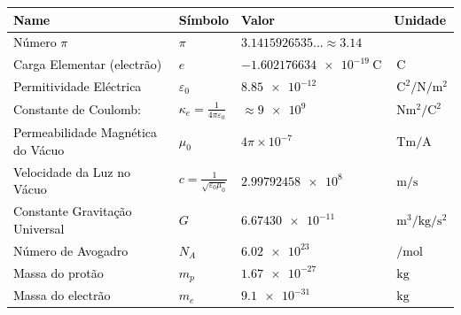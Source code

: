 \documentclass[a4paper,10pt]{extarticle} %
\newcommand{\mybox}[2]{
    \begin{tcolorbox}[colback=lightblue!5!white,colframe=lightblue!75!black,boxsep=1pt,arc=0pt,outer arc=0pt,title={\textcolor{black}{#1}}]
        \textcolor{black}{#2}
    \end{tcolorbox}
}
\begin{document}
\fontsize{7pt}{8pt}\selectfont
\mybox{Constantes Físicas}{
\begin{tabular}{||l|lll||}
\hline
{\bf Name}&{\bf Símbolo}&{\bf Valor}&{\bf Unidade}\\
\hline\hline
Número $\pi$                 &$\pi$& $ 3.1415926535...\approx 3.14 $ &\\
Carga Elementar (electrão)           &$e$& $\SI{-1.602176634e-19}{\coulomb}$& $\SI{}{\coulomb}$\\
Permitividade Eléctrica & $\varepsilon_0$ & $\SI{8.85e-12}{}$ & $\SI{}{\coulomb\squared\per\newton\per\meter\squared}$\\
Constante de Coulomb:  & $\kappa_e =\frac{1}{4\pi\varepsilon_0}$ & 
    $\approx \SI{9e9}{}$ & $\SI{}{\newton\meter\squared\per\coulomb\squared}$\\
Permeabilidade Magnética do Vácuo & $\mu_0$ &  $4 \pi \times 10^{-7}$ & $\SI{}{\tesla\meter\per\ampere}$\\
Velocidade da Luz no Vácuo & $ c= \frac{1}{\sqrt{\varepsilon_0 \mu_0}}$ & $\SI{2.99792458e8}{}$ & $\SI{}{\meter\per\second}$\\
Constante Gravitação Universal & $G$ & $\SI{6.67430e-11}{}$ & $\SI{}{\meter\cubed\per\kilogram\per\second\squared}$\\
Número de Avogadro &$N_A$ & $\SI{6.02e23}{}$ &$\SI{}{\per\mole}$\\ 
Massa do protão &$m_p$ & $\SI{1.67e-27}{}$ &$\SI{}{\kilogram}$\\ 
Massa do electrão &$m_e$ & $\SI{9.1e-31}{}$ &$\SI{}{\kilogram}$\\ 
\hline
\end{tabular}
}
\end{document}
